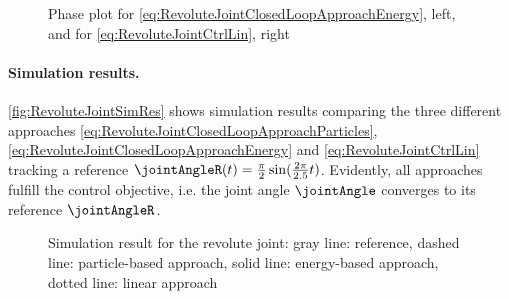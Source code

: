 \begin{figure}[ht]
 \centering
 
 \caption{Phase plot for \eqref{eq:RevoluteJointClosedLoopApproachEnergy}, left, and for \eqref{eq:RevoluteJointCtrlLin}, right}
 \label{fig:PhasePlotSO2}
\end{figure}

\paragraph{Simulation results.}
\autoref{fig:RevoluteJointSimRes} shows simulation results comparing the three different approaches \eqref{eq:RevoluteJointClosedLoopApproachParticles}, \eqref{eq:RevoluteJointClosedLoopApproachEnergy} and \eqref{eq:RevoluteJointCtrlLin} tracking a reference $\jointAngleR(t) = \tfrac{\pi}{2}\sin(\tfrac{2\pi}{2.5}t)$.
Evidently, all approaches fulfill the control objective, i.e. the joint angle $\jointAngle$ converges to its reference $\jointAngleR$.
\begin{figure}[ht]
 \centering
 
 \caption{Simulation result for the revolute joint: gray line: reference, dashed line: particle-based approach, solid line: energy-based approach, dotted line: linear approach}
 \label{fig:RevoluteJointSimRes}
\end{figure}
